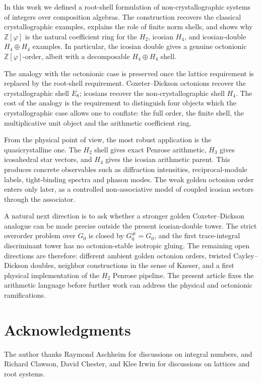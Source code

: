 \documentclass[12pt,oneside,english]{amsart}
\numberwithin{equation}{section}
\numberwithin{figure}{section}
\numberwithin{table}{section}
\theoremstyle{plain}
\theoremstyle{definition}
\theoremstyle{remark}
\newcommand{\Zphi}{\mathbb Z[\varphi]}
\begin{document}
In this work we defined a root-shell formulation of non-crystallographic systems of integers over composition algebras. The construction recovers the classical crystallographic examples, explains the role of finite norm shells, and shows why \(\Zphi\) is the natural coefficient ring for the \(H_2\), icosian \(H_4\), and icosian-double \(H_4\oplus H_4\) examples. In particular, the icosian double gives a genuine octonionic \(\Zphi\)-order, albeit with a decomposable \(H_4\oplus H_4\) shell.

The analogy with the octonionic case is preserved once the lattice requirement is replaced by the root-shell requirement. Coxeter--Dickson octonions recover the crystallographic shell \(E_8\); icosians recover the non-crystallographic shell \(H_4\). The cost of the analogy is the requirement to distinguish four objects which the crystallographic case allows one to conflate: the full order, the finite shell, the multiplicative unit object and the arithmetic coefficient ring.

From the physical point of view, the most robust application is the quasicrystalline one. The \(H_2\) shell gives exact Penrose arithmetic, \(H_3\) gives icosahedral star vectors, and \(H_4\) gives the icosian arithmetic parent. This produces concrete observables such as diffraction intensities, reciprocal-module labels, tight-binding spectra and phason modes. The weak golden octonion order enters only later, as a controlled non-associative model of coupled icosian sectors through the associator.

A natural next direction is to ask whether a stronger golden Coxeter--Dickson analogue can be made precise outside the present icosian-double tower. The strict overorder problem over \(G_0\) is closed by \(G_0^\#=G_0\), and the first trace-integral discriminant tower has no octonion-stable isotropic gluing. The remaining open directions are therefore: different ambient golden octonion orders, twisted Cayley--Dickson doubles, neighbor constructions in the sense of Kneser, and a first physical implementation of the \(H_2\) Penrose pipeline. The present article fixes the arithmetic language before further work can address the physical and octonionic ramifications.

\section*{Acknowledgments}

The author thanks Raymond Aschheim for discussions on integral numbers, and Richard Clawson,
David Chester, and Klee Irwin for discussions on lattices and root systems.
\end{document}
